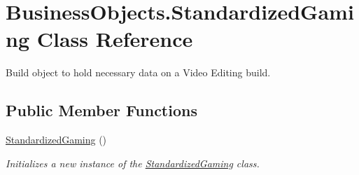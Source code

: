 \hypertarget{class_business_objects_1_1_standardized_gaming}{}\section{Business\+Objects.\+Standardized\+Gaming Class Reference}
\label{class_business_objects_1_1_standardized_gaming}


Build object to hold necessary data on a Video Editing build.  


\subsection*{Public Member Functions}
\begin{DoxyCompactItemize}
\item 
\hyperlink{class_business_objects_1_1_standardized_gaming_a4ac2db327e4f089b961113a37bf775e8}{Standardized\+Gaming} ()
\begin{DoxyCompactList}\small\item\em Initializes a new instance of the \hyperlink{class_business_objects_1_1_standardized_gaming}{Standardized\+Gaming} class. \end{DoxyCompactList}\end{DoxyCompactItemize}
